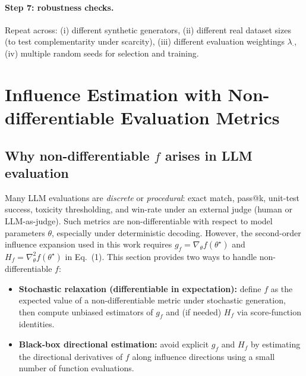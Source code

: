 \documentclass{article}
\theoremstyle{plain}
\theoremstyle{definition}
\theoremstyle{remark}
\begin{document}
\paragraph{Step 7: robustness checks.}
Repeat across:
(i) different synthetic generators,
(ii) different real dataset sizes (to test complementarity under scarcity),
(iii) different evaluation weightings $\lambda_\cdot$,
(iv) multiple random seeds for selection and training.



\section{Influence Estimation with Non-differentiable Evaluation Metrics}
\label{sec:nondiff_f}

\subsection{Why non-differentiable $f$ arises in LLM evaluation}
Many LLM evaluations are \emph{discrete} or \emph{procedural}:
exact match, pass@k, unit-test success, toxicity thresholding,
and win-rate under an external judge (human or LLM-as-judge).
Such metrics are non-differentiable with respect to model parameters $\theta$,
especially under deterministic decoding.
However, the second-order influence expansion used in this work requires
$g_f=\nabla_\theta f(\theta^\star)$ and $H_f=\nabla_\theta^2 f(\theta^\star)$
in Eq.~(1).
This section provides two ways to handle non-differentiable $f$:

\begin{itemize}
\item \textbf{Stochastic relaxation (differentiable in expectation):}
define $f$ as the expected value of a non-differentiable metric under stochastic generation,
then compute unbiased estimators of $g_f$ and (if needed) $H_f$ via score-function identities.
\item \textbf{Black-box directional estimation:}
avoid explicit $g_f$ and $H_f$ by estimating the directional derivatives of $f$
along influence directions using a small number of function evaluations.
\end{itemize}
\end{document}

